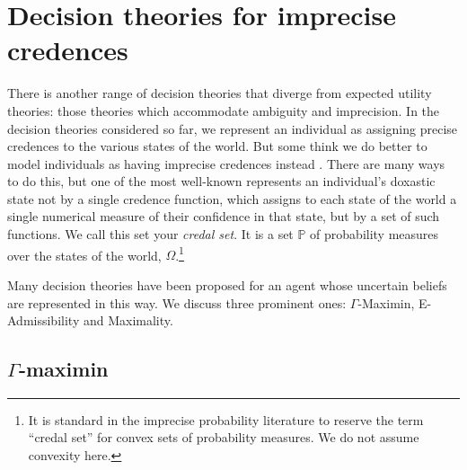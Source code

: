 \documentclass[a4paper]{article}
\renewcommand\P{\mathbb{P}} %
\newcommand{\IP}{\P}
\newcommand{\todoinfo}[2][]{\todo[backgroundcolor=orange!80,bordercolor=black,linecolor=gray!80, #1,inline,caption={}]{#2}}
\newenvironment{CCM rewritten}
{\begingroup\color{blue}} %
{\endgroup}              %
\begin{document}






\section{Decision theories for imprecise credences}

There is another range of decision theories that diverge from expected utility theories: those theories which accommodate ambiguity and imprecision. In the decision theories considered so far, we represent an individual as assigning precise credences to the various states of the world. But some think we do better to model individuals as having imprecise credences instead \citep{walley1991srip, bradley2016ip}. There are many ways to do this, but one of the most well-known represents an individual's doxastic state not by a single credence function, which assigns to each state of the world a single numerical measure of their confidence in that state, but by a set of such functions. We call this set your \textit{credal set}. It is a set $\IP$ of probability measures over the states of the world, $\Omega$.\footnote{{It is standard in the imprecise probability literature to reserve the term ``credal set'' for convex sets of probability measures. We do not assume convexity here.}}


Many decision theories have been proposed for an agent whose uncertain beliefs are represented in this way. We discuss three prominent ones: $\Gamma$-Maximin, E-Admissibility and Maximality. 



\subsection{$\Gamma$-maximin}\label{sect:gamma}
\end{document}
